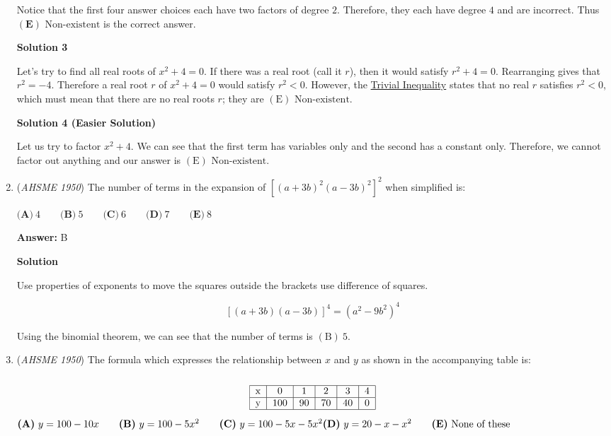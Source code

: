 \begin{enumerate}
Notice that the first four answer choices each have two factors of degree $2$.  Therefore, they each have degree $4$ and are incorrect.  Thus $\boxed{\mathbf{(E)}\text{ Non-existent}}$ is the correct answer.

 



\textbf{Solution 3}

Let's try to find all real roots of $x^2+4=0$. If there was a real root (call it $r$), then it would satisfy $r^2+4=0$. Rearranging gives that $r^2=-4$. Therefore a real root $r$ of $x^2+4=0$ would satisfy $r^2<0$. However, the \href{https://artofproblemsolving.com/wiki/index.php?title=Trivial\_Inequality}{Trivial Inequality} states that no real $r$ satisfies $r^2<0$, which must mean that there are no real roots $r$; they are $\boxed{\mathrm{(E)}\text{ Non-existent.}}$




\textbf{Solution 4 (Easier Solution)}

Let us try to factor $x^2+4.$ We can see that the first term has variables only and the second has a constant only. Therefore, we cannot factor out anything and our answer is $\boxed{\mathrm{(E)}\text{ Non-existent.}}$



	\item (\textit{AHSME 1950}) The number of terms in the expansion of $[(a+3b)^{2}(a-3b)^{2}]^{2}$ when simplified is:


 $\textbf{(A)}\ 4\qquad\textbf{(B)}\ 5\qquad\textbf{(C)}\ 6\qquad\textbf{(D)}\ 7\qquad\textbf{(E)}\ 8$

 \textbf{Answer: }B



\textbf{Solution}

Use properties of exponents to move the squares outside the brackets use difference of squares.

 
 \[[(a+3b)(a-3b)]^4 = (a^2-9b^2)^4\]

 Using the binomial theorem, we can see that the number of terms is $\boxed{\mathrm{(B)}\ 5}$.

 


	\item (\textit{AHSME 1950}) The formula which expresses the relationship between $x$ and $y$ as shown in the accompanying table is:


 
 \[\begin{tabular}[t]{|c|c|c|c|c|c|}\hline x&0&1&2&3&4\\\hline y&100&90&70&40&0\\\hline\end{tabular}\]
$\textbf{(A)}\ y=100-10x\qquad\textbf{(B)}\ y=100-5x^{2}\qquad\textbf{(C)}\ y=100-5x-5x^{2}\qquad\\ \textbf{(D)}\ y=20-x-x^{2}\qquad\textbf{(E)}\ \text{None of these}$


\end{enumerate}
